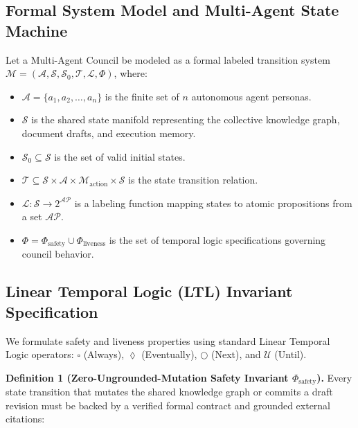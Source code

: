 \documentclass{article}
\begin{document}
\subsection{Formal System Model and Multi-Agent State Machine}


Let a Multi-Agent Council be modeled as a formal labeled transition system $\mathcal{M} = (\mathcal{A}, \mathcal{S}, \mathcal{S}_0, \mathcal{T}, \mathcal{L}, \Phi)$, where:
\begin{itemize}
  \item $\mathcal{A} = \{a_1, a_2, \ldots, a_n\}$ is the finite set of $n$ autonomous agent personas.
  \item $\mathcal{S}$ is the shared state manifold representing the collective knowledge graph, document drafts, and execution memory.
  \item $\mathcal{S}_0 \subseteq \mathcal{S}$ is the set of valid initial states.
  \item $\mathcal{T} \subseteq \mathcal{S} \times \mathcal{A} \times \mathcal{M}_{\text{action}} \times \mathcal{S}$ is the state transition relation.
  \item $\mathcal{L}: \mathcal{S} \to 2^{\mathcal{AP}}$ is a labeling function mapping states to atomic propositions from a set $\mathcal{AP}$.
  \item $\Phi = \Phi_{\text{safety}} \cup \Phi_{\text{liveness}}$ is the set of temporal logic specifications governing council behavior.
\end{itemize}




\subsection{Linear Temporal Logic (LTL) Invariant Specification}


We formulate safety and liveness properties using standard Linear Temporal Logic operators: $\square$ (Always), $\lozenge$ (Eventually), $\bigcirc$ (Next), and $\mathcal{U}$ (Until).

\textbf{Definition 1 (Zero-Ungrounded-Mutation Safety Invariant $\Phi_{\text{safety}}$).} Every state transition that mutates the shared knowledge graph or commits a draft revision must be backed by a verified formal contract and grounded external citations:
\end{document}
